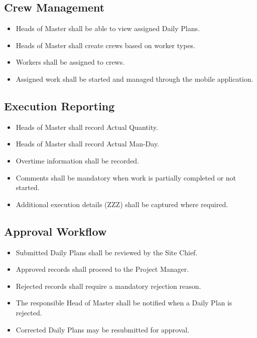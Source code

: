 \documentclass[11pt]{article}
\begin{document}
\subsection{Crew Management}

\begin{itemize}
    \item Heads of Master shall be able to view assigned Daily Plans.
    \item Heads of Master shall create crews based on worker types.
    \item Workers shall be assigned to crews.
    \item Assigned work shall be started and managed through the mobile
          application.
\end{itemize}

\subsection{Execution Reporting}

\begin{itemize}
    \item Heads of Master shall record Actual Quantity.
    \item Heads of Master shall record Actual Man-Day.
    \item Overtime information shall be recorded.
    \item Comments shall be mandatory when work is partially completed or not
          started.
    \item Additional execution details (ZZZ) shall be captured where required.
\end{itemize}

\subsection{Approval Workflow}

\begin{itemize}
    \item Submitted Daily Plans shall be reviewed by the Site Chief.
    \item Approved records shall proceed to the Project Manager.
    \item Rejected records shall require a mandatory rejection reason.
    \item The responsible Head of Master shall be notified when a Daily Plan is
          rejected.
    \item Corrected Daily Plans may be resubmitted for approval.
\end{itemize}
\end{document}
